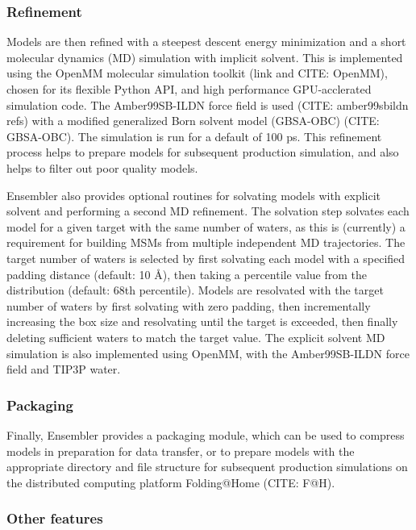 \documentclass[aps,pre,twocolumn,nofootinbib,superscriptaddress,linenumbers]{revtex4-1}
\begin{document}
\subsubsection{Refinement}

Models are then refined with a steepest descent energy minimization and a short molecular dynamics (MD) simulation with implicit solvent.
This is implemented using the OpenMM molecular simulation toolkit (link and CITE: OpenMM), chosen for its flexible Python API, and high performance GPU-acclerated simulation code.
The Amber99SB-ILDN force field is used (CITE: amber99sbildn refs) with a modified generalized Born solvent model (GBSA-OBC) (CITE: GBSA-OBC).
The simulation is run for a default of 100 ps.
This refinement process helps to prepare models for subsequent production simulation, and also helps to filter out poor quality models.

Ensembler also provides optional routines for solvating models with explicit solvent and performing a second MD refinement.
The solvation step solvates each model for a given target with the same number of waters, as this is (currently) a requirement for building MSMs from multiple independent MD trajectories.
The target number of waters is selected by first solvating each model with a specified padding distance (default: 10 \AA), then taking a percentile value from the distribution (default: 68th percentile).
Models are resolvated with the target number of waters by first solvating with zero padding, then incrementally increasing the box size and resolvating until the target is exceeded, then finally deleting sufficient waters to match the target value.
The explicit solvent MD simulation is also implemented using OpenMM, with the Amber99SB-ILDN force field and TIP3P water.

\subsubsection{Packaging}

Finally, Ensembler provides a packaging module, which can be used to compress models in preparation for data transfer, or to prepare models with the appropriate directory and file structure for subsequent production simulations on the distributed computing platform Folding@Home (CITE: F@H).

\subsubsection{Other features}
\end{document}
